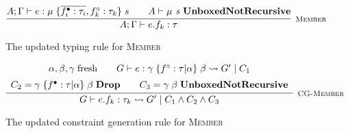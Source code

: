 \begin{figure}
    \centering
    \[
        \infer[\textsc{\footnotesize{Member}}]{
            A;\Gamma \vdash e.f_k : \tau
        }{
            A;\Gamma \vdash e : \mu\; \{ \overline{f_i^\bullet : \tau_i}, f_k^\circ : \tau_k \}\; s
            &\hspace{1em}
            A \vdash \mu \textit{ s } \textbf{UnboxedNotRecursive}
        }
    \]
    
    \caption{The updated typing rule for \textsc{Member}}
    \label{fig:membertypingrule}
\end{figure}

\begin{figure}
    \centering
    \[
        \infer[\textsc{\footnotesize{CG-Member}}]{
            G \vdash e.f_k : \tau_k \rightsquigarrow G'\; |\; C_1 \land C_2 \land C_3
        }{
            \begin{array}{c}
                \alpha, \beta, \gamma\; \text{fresh}
                \hspace{2em}
                G \vdash e : \gamma\; \{ f^\circ : \tau | \alpha \}\; \beta \rightsquigarrow G'\; |\; C_1 \\[5pt]
                C_2 = \gamma\; \{ f^\bullet : \tau | \alpha \}\; \beta\; \textbf{Drop}
                \hspace{2em}
                C_3 = \gamma\; \beta\; \textbf{UnboxedNotRecursive}
            \end{array}
        }
    \]
    
    \caption{The updated constraint generation rule for \textsc{Member}}
    \label{fig:memberconstraintgen}
\end{figure}

